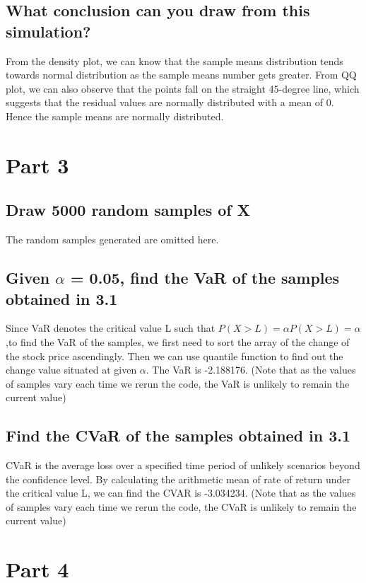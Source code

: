\documentclass{zjureport}
\begin{document}
\subsection{What conclusion can you draw from this simulation?}
From the density plot, we can know that the sample means distribution tends towards normal distribution as the sample means number gets greater. From QQ plot, we can also observe that the points fall on the straight 45-degree line, which suggests that the residual values are normally distributed with a mean of 0. Hence the sample means are normally distributed.

\section{Part 3}
\subsection{Draw 5000 random samples of X}
The random samples generated are omitted here.

\subsection{Given $\alpha$ = 0.05, find the VaR of the samples obtained in 3.1}
Since VaR denotes the critical value L such that $P(X>L)=\alpha P(X>L)=\alpha$ ,to find the VaR of the samples, we first need to sort the array of the change of the stock price ascendingly. Then we can use quantile function to find out the change value situated at given $\alpha$. The VaR is -2.188176. (Note that as the values of samples vary each time we rerun the code, the VaR is unlikely to remain the current value)

\subsection{Find the CVaR of the samples obtained in 3.1}
CVaR is the average loss over a specified time period of unlikely scenarios beyond the confidence level. By calculating the arithmetic mean of rate of return under the critical value L, we can find the CVAR is -3.034234. (Note that as the values of samples vary each time we rerun the code, the CVaR is unlikely to remain the current value)



\section{Part 4}
\end{document}
